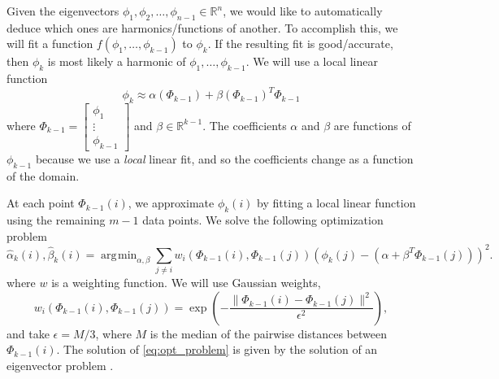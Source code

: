 \documentclass[preprint]{elsarticle}
\DeclareMathOperator*{\argmin}{\arg\!\min}
\begin{document}
Given the eigenvectors $\phi_1, \phi_2, \dots, \phi_{n-1} \in \mathbb{R}^n$, we would like to automatically deduce which ones are harmonics/functions of another. 
%
To accomplish this, we will fit a function $f(\phi_1, \dots, \phi_{k-1})$ to $\phi_{k}$. 
%
If the resulting fit is good/accurate, then $\phi_{k}$ is most likely a harmonic of $\phi_1, \dots, \phi_{k-1}$. 
%
We will use a local linear function 
\begin{equation}
\phi_k \approx \alpha( \Phi_{k-1}) + \beta(\Phi_{k-1})^T \Phi_{k-1}
\end{equation}
where 
%
$\Phi_{k-1} = \begin{bmatrix} \phi_1 \\ \vdots \\ \phi_{k-1} \end{bmatrix}$
and $\beta \in \mathbb{R}^{k-1}$. 
%
The coefficients $\alpha$ and $\beta$ are functions of $\phi_{k-1}$ because we use a {\em local} linear fit, and so the coefficients change as a function of the domain. 

At each point $\Phi_{k-1}(i)$, we approximate $\phi_k(i)$ by fitting a local linear function using the remaining $m-1$ data points. 
%
We solve the following optimization problem 
\begin{equation} \label{eq:opt_problem}
\hat{\alpha}_k (i) , \hat{\beta}_k(i)  = \argmin_{\alpha, \beta} \sum_{j \ne i} w_i(\Phi_{k-1}(i), \Phi_{k-1}(j)) \left( \phi_{k}(j) - (\alpha + \beta^T \Phi_{k-1}(j)) \right)^2.
\end{equation}
%
where $w$ is a weighting function.
%
We will use Gaussian weights, 
%
\begin{equation}
w_i(\Phi_{k-1}(i), \Phi_{k-1}(j))  = \exp \left( - \frac{\|\Phi_{k-1}(i) - \Phi_{k-1} (j) \|^2}{\epsilon^2} \right),
\end{equation}
%
and take $\epsilon = M / 3$, where $M$ is the median of the pairwise distances between $\Phi_{k-1}(i)$.
%
The solution of \eqref{eq:opt_problem} is given by the solution of an eigenvector problem \cite{...}.
\end{document}
